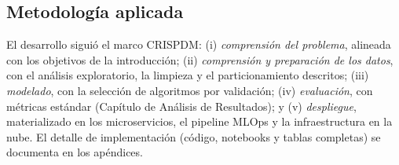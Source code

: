 \subsection{Metodología aplicada}

El desarrollo siguió el marco \acrfull{CRISPDM}: (i) \textit{comprensión del problema}, alineada con los objetivos de la introducción; (ii) \textit{comprensión y preparación de los datos}, con el análisis exploratorio, la limpieza y el particionamiento descritos; (iii) \textit{modelado}, con la selección de algoritmos por validación; (iv) \textit{evaluación}, con métricas estándar (Capítulo de Análisis de Resultados); y (v) \textit{despliegue}, materializado en los microservicios, el pipeline \acrshort{MLOps} y la infraestructura en la nube. El detalle de implementación (código, notebooks y tablas completas) se documenta en los apéndices.
